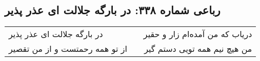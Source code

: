 \begin{center}
\section*{رباعی شماره ۳۳۸: در بارگه جلالت ای عذر پذیر}
\label{sec:sh338}
\begin{longtable}{l p{0.5cm} r}
در بارگه جلالت ای عذر پذیر
&&
دریاب که من آمده‌ام زار و حقیر
\\
از تو همه رحمتست و از من تقصیر
&&
من هیچ نیم همه تویی دستم گیر
\\
\end{longtable}
\end{center}

